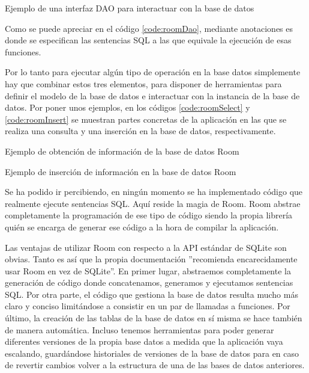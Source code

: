 \begin{listing}[H]
	\caption{Ejemplo de una interfaz DAO para interactuar con la base de datos}
	
	\label{code:roomDao}
\end{listing}

Como se puede apreciar en el código \ref{code:roomDao}, mediante anotaciones es donde se especifican las sentencias SQL a las que equivale la ejecución de esas funciones.

Por lo tanto para ejecutar algún tipo de operación en la base datos simplemente hay que combinar estos tres elementos, para disponer de herramientas para definir el modelo de la base de datos e interactuar con la instancia de la base de datos. Por poner unos ejemplos, en los códigos \ref{code:roomSelect} y \ref{code:roomInsert} se muestran partes concretas de la aplicación en las que se realiza una consulta y una inserción en la base de datos, respectivamente.


\begin{listing}[H]
	\caption{Ejemplo de obtención de información de la base de datos Room}
	
	\label{code:roomSelect}
\end{listing}

\begin{listing}[H]
	\caption{Ejemplo de inserción de información en la base de datos Room}
	
	\label{code:roomInsert}
\end{listing}

Se ha podido ir percibiendo, en ningún momento se ha implementado código que realmente ejecute sentencias SQL. Aquí reside la magia de Room. Room abstrae completamente la programación de ese tipo de código siendo la propia librería quién se encarga de generar ese código a la hora de compilar la aplicación.

Las ventajas de utilizar Room con respecto a la API estándar de SQLite son obvias. Tanto es así que la propia documentación ''recomienda encarecidamente usar Room en vez de SQLite''\cite{room-training}. En primer lugar, abstraemos completamente la generación de código donde concatenamos, generamos y ejecutamos sentencias SQL. Por otra parte, el código que gestiona la base de datos resulta mucho más claro y conciso limitándose a consistir en un par de llamadas a funciones. Por último, la creación de las tablas de la base de datos en sí misma se hace también de manera automática. Incluso tenemos herramientas para poder generar diferentes versiones de la propia base datos a medida que la aplicación vaya escalando, guardándose historiales de versiones de la base de datos para en caso de revertir cambios volver a la estructura de una de las bases de datos anteriores.

